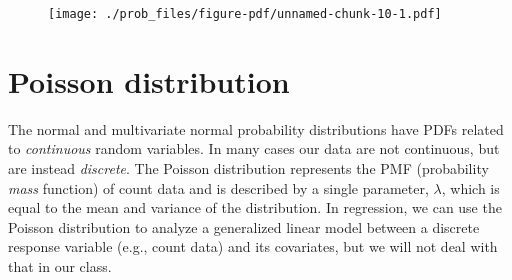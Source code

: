 \documentclass[
  letterpaper,
  DIV=11,
  numbers=noendperiod]{scrreprt}
\begin{document}
\begin{figure}[H]

{\centering \texttt{[image: ./prob\_files/figure-pdf/unnamed-chunk-10-1.pdf]}

}

\end{figure}

\hypertarget{poisson-distribution}{%
\section{Poisson distribution}\label{poisson-distribution}}

The normal and multivariate normal probability distributions have PDFs
related to \emph{continuous} random variables. In many cases our data
are not continuous, but are instead \emph{discrete}. The Poisson
distribution represents the PMF (probability \emph{mass} function) of
count data and is described by a single parameter, \(\lambda\), which is
equal to the mean and variance of the distribution. In regression, we
can use the Poisson distribution to analyze a generalized linear model
between a discrete response variable (e.g., count data) and its
covariates, but we will not deal with that in our class.
\end{document}
